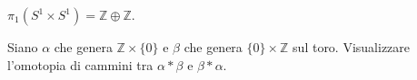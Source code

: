 \begin{cor}
  $\pi_1(S^1 \times S^1)=\mathbb{Z} \oplus \mathbb{Z}$.
\end{cor}

\begin{exc}
  Siano $\alpha$ che genera $\mathbb{Z} \times \{0\}$ e $\beta$ che genera $\{0\} \times \mathbb{Z}$ sul toro. Visualizzare l'omotopia di cammini tra $\alpha * \beta$ e $\beta * \alpha$.
\end{exc}
